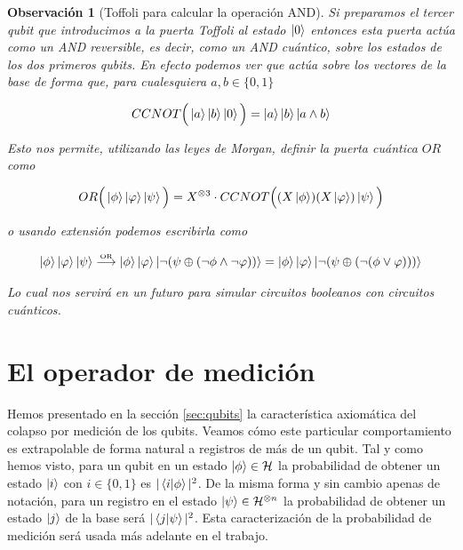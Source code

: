 \documentclass[11pt, spanish]{report}
\numberwithin{equation}{section}
\newtheorem{obs}[defin]{Observación}
\numberwithin{defin}{section}
\begin{document}
\begin{obs}[Toffoli para calcular la operación AND]
Si preparamos el tercer qubit que introducimos a la puerta Toffoli al estado $\ket{0}$ entonces esta puerta actúa como un AND reversible, es decir, como un AND cuántico, sobre los estados de los dos primeros qubits. En efecto podemos ver que actúa sobre los vectores de la base de forma que, para cualesquiera $a,b\in\{0,1\}$

\begin{equation}
CCNOT\Big(\ket{a}\ket{b}\ket{0}\Big)=\ket{a}\ket{b}\ket{a\wedge b}
\end{equation}

Esto nos permite, utilizando las leyes de Morgan, definir la puerta cuántica $OR$ como

\begin{equation}
OR\Big(\ket{\phi}\ket{\varphi}\ket{\psi}\Big)=X^{\otimes 3}\cdot CCNOT\Big((X\ket{\phi})(X\ket{\varphi})\ket{\psi}\Big)
\end{equation}

o usando extensión podemos escribirla como

\begin{equation}
\ket{\phi}\ket{\varphi}\ket{\psi}\mathrel{\stackrel{\makebox[0pt]{\mbox{\normalfont\tiny OR}}}{\longrightarrow}}\ket{\phi}\ket{\varphi}\ket{\lnot(\psi\oplus(\lnot \phi \wedge \lnot \varphi))}=\ket{\phi}\ket{\varphi}\ket{\lnot(\psi\oplus(\lnot (\phi \vee \varphi)))}
\end{equation}

Lo cual nos servirá en un futuro para simular circuitos booleanos con circuitos cuánticos.\\

\end{obs}

\section{El operador de medición}

Hemos presentado en la sección \ref{sec:qubits} la característica axiomática del colapso por medición de los qubits. Veamos cómo este particular comportamiento es extrapolable de forma natural a registros de más de un qubit. Tal y como hemos visto, para un qubit en un estado $\ket{\phi}\in\mathcal{H}$ la probabilidad de obtener un estado $\ket{i}$ con $i\in\{0,1\}$ es $|\bra{i}\ket{\phi}|^2$. De la misma forma y sin cambio apenas de notación, para un registro en el estado $\ket{\psi}\in\mathcal{H}^{\otimes n}$ la probabilidad de obtener un estado $\ket{j}$ de la base será $|\bra{j}\ket{\psi}|^2$. Esta caracterización de la probabilidad de medición será usada más adelante en el trabajo.\\
\end{document}
